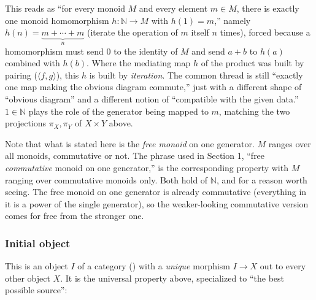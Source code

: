 \begin{center}

\end{center}

This reads as ``for every monoid \(M\) and every element \(m \in M\), there is exactly one monoid homomorphism \(h : \mathbb{N} \to M\) with \(h(1) = m\),'' namely \(h(n) = \underbrace{m + \cdots + m}_{n}\) (iterate the operation of \(m\) itself \(n\) times), forced because a homomorphism must send \(0\) to the identity of \(M\) and send \(a+b\) to \(h(a)\) combined with \(h(b)\). Where the mediating map \(h\) of the product was built by pairing (\(\langle f, g\rangle\)), this \(h\) is built by \emph{iteration}. The common thread is still ``exactly one map making the obvious diagram commute,'' just with a different shape of ``obvious diagram'' and a different notion of ``compatible with the given data.'' \(1 \in \mathbb{N}\) plays the role of the generator being mapped to \(m\), matching the two projections \(\pi_X,\pi_Y\) of \(X\times Y\) above.

Note that what is stated here is the \emph{free monoid} on one generator. \(M\) ranges over all monoids, commutative or not. The phrase used in Section 1, ``free \emph{commutative} monoid on one generator,'' is the corresponding property with \(M\) ranging over commutative monoids only. Both hold of \(\mathbb{N}\), and for a reason worth seeing. The free monoid on one generator is already commutative (everything in it is a power of the single generator), so the weaker-looking commutative version comes for free from the stronger one.

\subsubsection{Initial object}\label{sec:02-terminology-and-coc:01-terminology:8}

This is an object \(I\) of a category (\cite{MacLane1998}) with a \emph{unique} morphism \(I \to X\) out to every other object \(X\). It is the universal property above, specialized to ``the best possible source'':

\begin{center}

\end{center}

